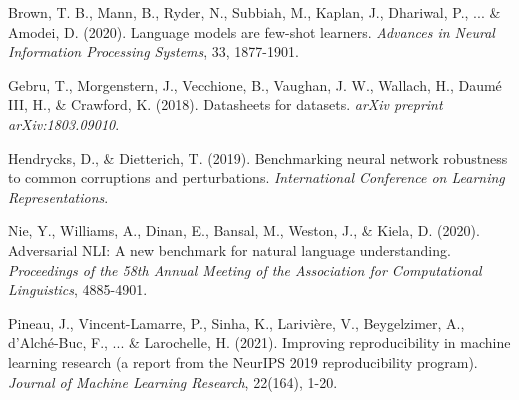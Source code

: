 Brown, T. B., Mann, B., Ryder, N., Subbiah, M., Kaplan, J., Dhariwal, P., ... \& Amodei, D. (2020). Language models are few-shot learners. \textit{Advances in Neural Information Processing Systems}, 33, 1877-1901.

Gebru, T., Morgenstern, J., Vecchione, B., Vaughan, J. W., Wallach, H., Daumé III, H., \& Crawford, K. (2018). Datasheets for datasets. \textit{arXiv preprint arXiv:1803.09010}.

Hendrycks, D., \& Dietterich, T. (2019). Benchmarking neural network robustness to common corruptions and perturbations. \textit{International Conference on Learning Representations}.

Nie, Y., Williams, A., Dinan, E., Bansal, M., Weston, J., \& Kiela, D. (2020). Adversarial NLI: A new benchmark for natural language understanding. \textit{Proceedings of the 58th Annual Meeting of the Association for Computational Linguistics}, 4885-4901.

Pineau, J., Vincent-Lamarre, P., Sinha, K., Larivière, V., Beygelzimer, A., d'Alché-Buc, F., ... \& Larochelle, H. (2021). Improving reproducibility in machine learning research (a report from the NeurIPS 2019 reproducibility program). \textit{Journal of Machine Learning Research}, 22(164), 1-20.
